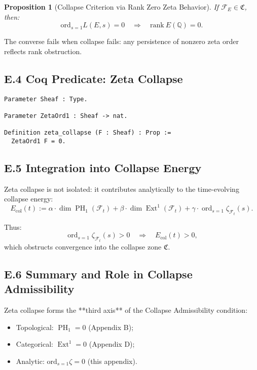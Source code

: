 \documentclass[11pt]{article}
\newtheorem{proposition}[theorem]{Proposition}
\DeclareMathOperator{\Ext}{Ext}
\DeclareMathOperator{\PH}{PH}
\newcommand{\ord}{\operatorname{ord}}
\begin{document}
\begin{proposition}[Collapse Criterion via Rank Zero Zeta Behavior]
\label{prop:zeta-collapse}
If \( \mathcal{F}_E \in \mathfrak{C} \), then:
\[
\mathrm{ord}_{s=1} L(E, s) = 0 \quad \Rightarrow \quad \mathrm{rank}~E(\mathbb{Q}) = 0.
\]
\end{proposition}

The converse fails when collapse fails: any persistence of nonzero zeta order reflects rank obstruction.

\subsection*{E.4 Coq Predicate: Zeta Collapse}
\begin{lstlisting}[language=Coq]
Parameter Sheaf : Type.

Parameter ZetaOrd1 : Sheaf -> nat.

Definition zeta_collapse (F : Sheaf) : Prop :=
  ZetaOrd1 F = 0.
\end{lstlisting}

\subsection*{E.5 Integration into Collapse Energy}

Zeta collapse is not isolated: it contributes analytically to the time-evolving collapse energy:
\[
E_{\mathrm{col}}(t) := \alpha \cdot \dim \PH_1(\mathcal{F}_t) + \beta \cdot \dim \Ext^1(\mathcal{F}_t) + \gamma \cdot \ord_{s=1} \zeta_{\mathcal{F}_t}(s).
\]

Thus:
\[
\ord_{s=1} \zeta_{\mathcal{F}_t}(s) > 0 \quad \Rightarrow \quad E_{\mathrm{col}}(t) > 0,
\]
which obstructs convergence into the collapse zone \( \mathfrak{C} \).

\subsection*{E.6 Summary and Role in Collapse Admissibility}

Zeta collapse forms the **third axis** of the Collapse Admissibility condition:
\begin{itemize}
  \item Topological: \( \PH_1 = 0 \) (Appendix B);
  \item Categorical: \( \Ext^1 = 0 \) (Appendix D);
  \item Analytic: \( \mathrm{ord}_{s=1} \zeta = 0 \) (this appendix).
\end{itemize}
\end{document}
